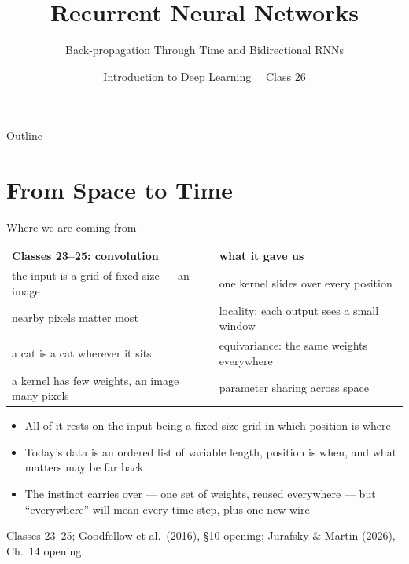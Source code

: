 \documentclass[aspectratio=169, 11pt]{beamer}
\title{Recurrent Neural Networks}
\subtitle{Back-propagation Through Time and Bidirectional RNNs}
\author{Introduction to Deep Learning \ \textperiodcentered\ Class 26}
\institute{}
\date{}
\newcommand{\srcline}[1]{%
  \par\vspace{0.25em}%
  {\scriptsize\color{mcMuted}\hfill #1\par}}
\newcommand{\src}[3]{}      %
\newcommand{\nosrc}{}       %
\begin{document}
\maketitle

\begin{frame}{Outline}
  \nosrc
  \tableofcontents
\end{frame}

\section{From Space to Time}

\begin{frame}{Where we are coming from}
  \src{goodfellow2016}{chapter}{10}
  \src{jurafsky_slp3}{chapter}{14}
  \vspace{-0.3em}
  {\scriptsize
  \renewcommand{\arraystretch}{1.3}
  \begin{tabular}{@{}l@{\hspace{1.2em}}l@{}}
    \textbf{Classes 23--25: convolution} & \textbf{what it gave us}\\
    the input is a \alert{grid} of fixed size --- an image & one kernel slides over every position\\
    nearby pixels matter most & locality: each output sees a small window\\
    a cat is a cat wherever it sits & equivariance: the same weights everywhere\\
    a kernel has few weights, an image many pixels & parameter sharing across \alert{space}\\
  \end{tabular}}
  \vspace{0.4em}

  {\footnotesize
  \begin{itemize}\itemsep0.2em
    \item All of it rests on the input being a fixed-size grid in which
          position is \alert{where}
    \item Today's data is an \alert{ordered list of variable length},
          position is \alert{when}, and what matters may be far back
    \item The instinct carries over --- one set of weights, reused
          everywhere --- but ``everywhere'' will mean every \alert{time
          step}, plus one new wire
  \end{itemize}}
  \srcline{Classes 23--25; Goodfellow et al.\ (2016), \S10 opening; Jurafsky \& Martin (2026), Ch.~14 opening.}
\end{frame}
\end{document}
